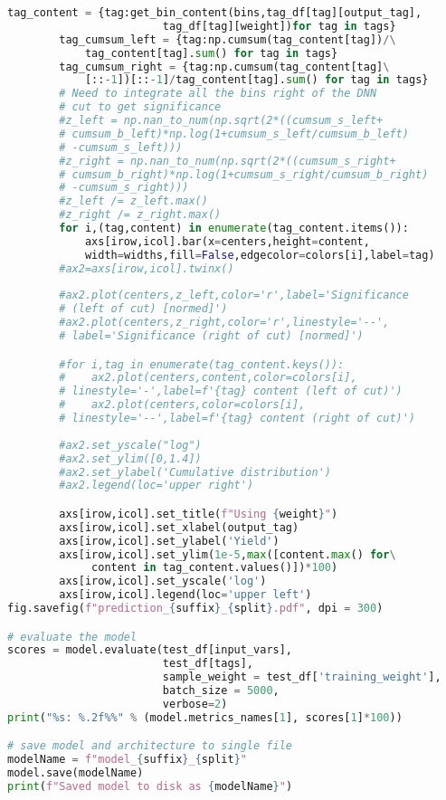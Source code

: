 \begin{lstlisting}[language=Python, caption=Python module of the analysis used in Bamboo framework, label={dnncode}]
        tag_content = {tag:get_bin_content(bins,tag_df[tag][output_tag],
                        tag_df[tag][weight])for tag in tags}
        tag_cumsum_left = {tag:np.cumsum(tag_content[tag])/\
            tag_content[tag].sum() for tag in tags}
        tag_cumsum_right = {tag:np.cumsum(tag_content[tag]\
            [::-1])[::-1]/tag_content[tag].sum() for tag in tags}
        # Need to integrate all the bins right of the DNN 
        # cut to get significance
        #z_left = np.nan_to_num(np.sqrt(2*((cumsum_s_left+
        # cumsum_b_left)*np.log(1+cumsum_s_left/cumsum_b_left)
        # -cumsum_s_left)))
        #z_right = np.nan_to_num(np.sqrt(2*((cumsum_s_right+
        # cumsum_b_right)*np.log(1+cumsum_s_right/cumsum_b_right)
        # -cumsum_s_right)))
        #z_left /= z_left.max()
        #z_right /= z_right.max()
        for i,(tag,content) in enumerate(tag_content.items()):
            axs[irow,icol].bar(x=centers,height=content,
            width=widths,fill=False,edgecolor=colors[i],label=tag)     
        #ax2=axs[irow,icol].twinx()   
        
        #ax2.plot(centers,z_left,color='r',label='Significance
        # (left of cut) [normed]')
        #ax2.plot(centers,z_right,color='r',linestyle='--',
        # label='Significance (right of cut) [normed]')

        #for i,tag in enumerate(tag_content.keys()):
        #    ax2.plot(centers,content,color=colors[i],
        # linestyle='-',label=f'{tag} content (left of cut)')
        #    ax2.plot(centers,color=colors[i],
        # linestyle='--',label=f'{tag} content (right of cut)')
        
        #ax2.set_yscale("log")
        #ax2.set_ylim([0,1.4])
        #ax2.set_ylabel('Cumulative distribution')
        #ax2.legend(loc='upper right')

        axs[irow,icol].set_title(f"Using {weight}")
        axs[irow,icol].set_xlabel(output_tag)
        axs[irow,icol].set_ylabel('Yield')
        axs[irow,icol].set_ylim(1e-5,max([content.max() for\
             content in tag_content.values()])*100)
        axs[irow,icol].set_yscale('log')
        axs[irow,icol].legend(loc='upper left')
fig.savefig(f"prediction_{suffix}_{split}.pdf", dpi = 300)

# evaluate the model
scores = model.evaluate(test_df[input_vars], 
                        test_df[tags], 
                        sample_weight = test_df['training_weight'], 
                        batch_size = 5000,
                        verbose=2)
print("%s: %.2f%%" % (model.metrics_names[1], scores[1]*100))

# save model and architecture to single file
modelName = f"model_{suffix}_{split}"
model.save(modelName)
print(f"Saved model to disk as {modelName}")
\end{lstlisting}